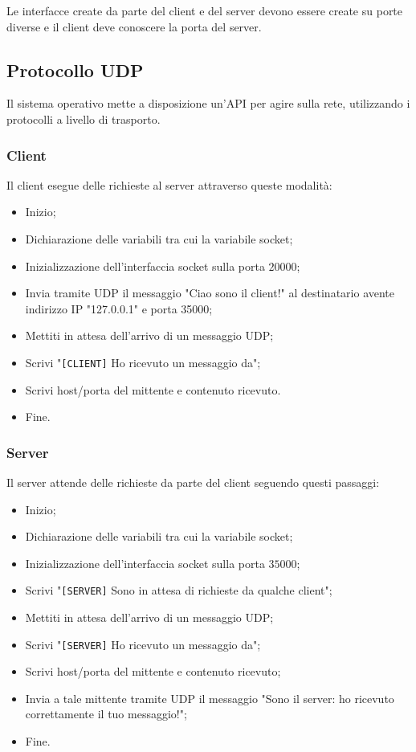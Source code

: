 \documentclass[oneside,a4paper,11pt]{book}
\theoremstyle{italicstyle}
\theoremstyle{normStyle}
\begin{document}
Le interfacce create da parte del client e del server devono essere 
create su porte diverse e il client deve conoscere la porta del server.
\subsection{Protocollo UDP}
Il sistema operativo mette a disposizione un'API per agire sulla 
rete, utilizzando i protocolli a livello di trasporto.
\subsubsection{Client}
Il client esegue delle richieste al server attraverso 
queste modalità:
\begin{itemize}
  \item Inizio;
  \item Dichiarazione delle variabili tra cui la variabile socket;
  \item Inizializzazione dell’interfaccia socket sulla porta $20000$;
  \item Invia tramite UDP il messaggio "Ciao sono il client!" al destinatario avente indirizzo IP "127.0.0.1" e porta 35000;
  \item Mettiti in attesa dell’arrivo di un messaggio UDP;
  \item Scrivi "\verb|[CLIENT]| Ho ricevuto un messaggio da";
  \item Scrivi host/porta del mittente e contenuto ricevuto.
  \item Fine.
\end{itemize}

\subsubsection{Server}
Il server attende delle richieste da parte del client seguendo 
questi passaggi:
\begin{itemize}
  \item Inizio;
  \item Dichiarazione delle variabili tra cui la variabile socket;
  \item Inizializzazione dell’interfaccia socket sulla porta $35000$;
  \item Scrivi "\verb|[SERVER]| Sono in attesa di richieste da qualche client";
  \item Mettiti in attesa dell’arrivo di un messaggio UDP;
  \item Scrivi "\verb|[SERVER]| Ho ricevuto un messaggio da";
  \item Scrivi host/porta del mittente e contenuto ricevuto;
  \item Invia a tale mittente tramite UDP il messaggio "Sono il server: ho ricevuto correttamente il tuo messaggio!";
  \item Fine.
\end{itemize}
\end{document}
